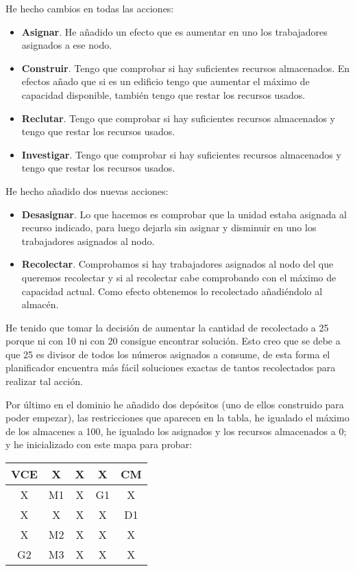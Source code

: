 \documentclass[a4paper,11pt]{article}
\begin{document}
He hecho cambios en todas las acciones:

\begin{itemize}
\item \textbf{Asignar}. He añadido un efecto que es aumentar en uno los trabajadores asignados a ese nodo.
\item \textbf{Construir}. Tengo que comprobar si hay suficientes recursos almacenados. En efectos añado que si es un edificio tengo que aumentar el máximo de capacidad disponible, también tengo que restar los recursos usados.
\item \textbf{Reclutar}. Tengo que comprobar si hay suficientes recursos almacenados y tengo que restar los recursos usados.
\item \textbf{Investigar}. Tengo que comprobar si hay suficientes recursos almacenados y tengo que restar los recursos usados.
\end{itemize}

He hecho añadido dos nuevas acciones:

\begin{itemize}
\item \textbf{Desasignar}. Lo que hacemos es comprobar que la unidad estaba asignada al recurso indicado, para luego dejarla sin asignar y disminuir en uno los trabajadores asignados al nodo.
\item \textbf{Recolectar}. Comprobamos si hay trabajadores asignados al nodo del que queremos recolectar y si al recolectar cabe comprobando con el máximo de capacidad actual. Como efecto obtenemos lo recolectado añadiéndolo al almacén.
\end{itemize}

He tenido que tomar la decisión de aumentar la cantidad de recolectado a 25 porque ni con 10 ni con 20 consigue encontrar solución. Esto creo que se debe a que 25 es divisor de todos los números asignados a consume, de esta forma el planificador encuentra más fácil soluciones exactas de tantos recolectados para realizar tal acción.

Por último en el dominio he añadido dos depósitos (uno de ellos construido para poder empezar), las restricciones que aparecen en la tabla, he igualado el máximo de los almacenes a 100, he igualado los asignados y los recursos almacenados a 0; y he inicializado con este mapa para probar:

\begin{table}[h]
\begin{tabular}{|c|c|c|c|c|}
\hline
VCE  & X  & X & X  & CM  \\ \hline
X    & M1 & X & G1 & X   \\ \hline
X    & X  & X & X  & D1   \\ \hline
X    & M2 & X & X  & X   \\ \hline
G2   & M3 & X & X  & X   \\ \hline
\end{tabular}
\end{table}
\end{document}
